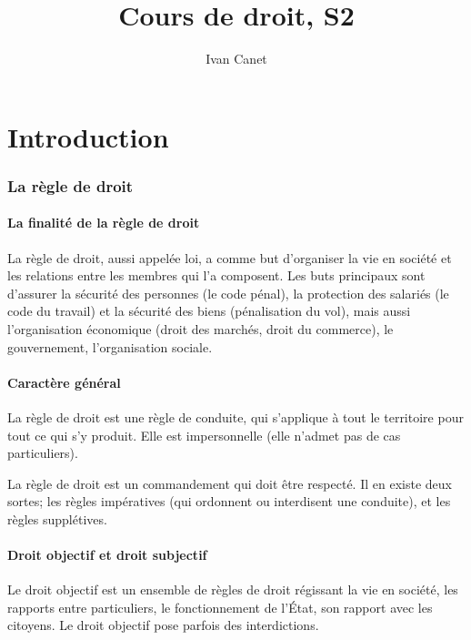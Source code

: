 \documentclass[10pt,a4paper]{article}
\begin{document}
\title{Cours de droit, S2}
\author{Ivan Canet}
\maketitle
\tableofcontents

\part{Introduction}

\section{La règle de droit}

\subsection{La finalité de la règle de droit}

La règle de droit, aussi appelée loi, a comme but d'organiser la vie en société et les relations entre les membres qui l'a composent. Les buts principaux sont d'assurer la sécurité des personnes (le code pénal), la protection des salariés (le code du travail) et la sécurité des biens (pénalisation du vol), mais aussi l'organisation économique (droit des marchés, droit du commerce), le gouvernement, l'organisation sociale.

\subsection{Caractère général}

La règle de droit est une règle de conduite, qui s'applique à tout le territoire pour tout ce qui s'y produit. Elle est impersonnelle (elle n'admet pas de cas particuliers).

La règle de droit est un commandement qui doit être respecté. Il en existe deux sortes; les règles impératives (qui ordonnent ou interdisent une conduite), et les règles supplétives.

\subsection{Droit objectif et droit subjectif}

Le droit objectif est un ensemble de règles de droit régissant la vie en société, les rapports entre particuliers, le fonctionnement de l'État, son rapport avec les citoyens. Le droit objectif pose parfois des interdictions.
\end{document}
